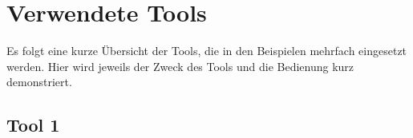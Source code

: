 \chapter{Verwendete Tools}
Es folgt eine kurze Übersicht der Tools, die in den Beispielen mehrfach eingesetzt werden. Hier wird jeweils der Zweck des Tools und die Bedienung kurz demonstriert.

\section{Tool 1}
